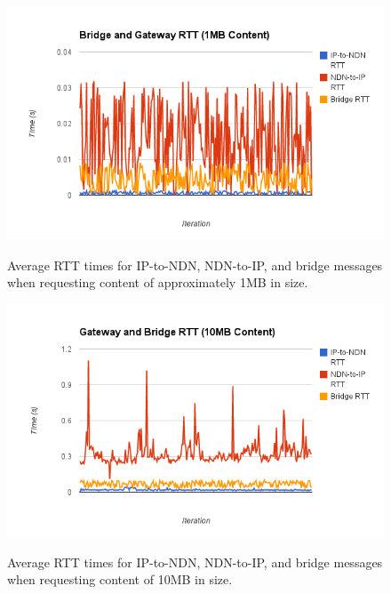 \begin{figure}
\begin{center}
\includegraphics[scale=0.7]{./images/small.png}
\label{fig:perf1}
\caption{Average RTT times for IP-to-NDN, NDN-to-IP, and bridge messages when requesting content of approximately 1MB in size.}
\end{center}
\end{figure}

\begin{figure}
\begin{center}
\includegraphics[scale=0.7]{./images/large.png}
\label{fig:perf2}
\caption{Average RTT times for IP-to-NDN, NDN-to-IP, and bridge messages when requesting content of 10MB in size.}
\end{center}
\end{figure}


